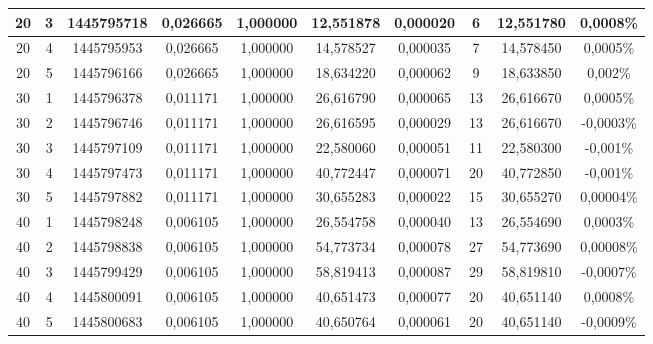 \begin{landscape}
\begin{center}
\begin{table}[htbp]
\begin{tabular}{cccccccccc}
\hline
        20 &          3 & 1445795718 &   0,026665 &   1,000000 &  12,551878 &   0,000020 &          6 &  12,551780 &   0,0008\% \\
\hline
        20 &          4 & 1445795953 &   0,026665 &   1,000000 &  14,578527 &   0,000035 &          7 &  14,578450 &   0,0005\% \\
\hline
        20 &          5 & 1445796166 &   0,026665 &   1,000000 &  18,634220 &   0,000062 &          9 &  18,633850 &    0,002\% \\
\hline
        30 &          1 & 1445796378 &   0,011171 &   1,000000 &  26,616790 &   0,000065 &         13 &  26,616670 &   0,0005\% \\
\hline
        30 &          2 & 1445796746 &   0,011171 &   1,000000 &  26,616595 &   0,000029 &         13 &  26,616670 &  -0,0003\% \\
\hline
        30 &          3 & 1445797109 &   0,011171 &   1,000000 &  22,580060 &   0,000051 &         11 &  22,580300 &   -0,001\% \\
\hline
        30 &          4 & 1445797473 &   0,011171 &   1,000000 &  40,772447 &   0,000071 &         20 &  40,772850 &   -0,001\% \\
\hline
        30 &          5 & 1445797882 &   0,011171 &   1,000000 &  30,655283 &   0,000022 &         15 &  30,655270 &  0,00004\% \\
\hline
        40 &          1 & 1445798248 &   0,006105 &   1,000000 &  26,554758 &   0,000040 &         13 &  26,554690 &   0,0003\% \\
\hline
        40 &          2 & 1445798838 &   0,006105 &   1,000000 &  54,773734 &   0,000078 &         27 &  54,773690 &  0,00008\% \\
\hline
        40 &          3 & 1445799429 &   0,006105 &   1,000000 &  58,819413 &   0,000087 &         29 &  58,819810 &  -0,0007\% \\
\hline
        40 &          4 & 1445800091 &   0,006105 &   1,000000 &  40,651473 &   0,000077 &         20 &  40,651140 &   0,0008\% \\
\hline
        40 &          5 & 1445800683 &   0,006105 &   1,000000 &  40,650764 &   0,000061 &         20 &  40,651140 &  -0,0009\% \\
\hline \hline
\end{tabular}
\end{table}  
\end{center}
\end{landscape}


